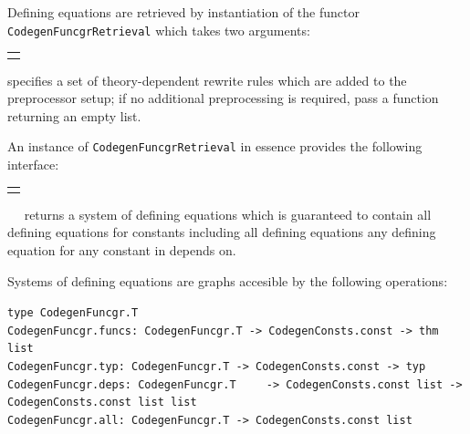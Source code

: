 \begin{isabellebody}
\begin{isamarkuptext}
  Defining equations are retrieved by instantiation
  of the functor \verb|CodegenFuncgrRetrieval|
  which takes two arguments:

  \medskip
  \begin{tabular}{l}
  \isa{val\ rewrites{\isacharcolon}\ theory\ {\isasymrightarrow}\ thm\ list}
  \end{tabular}

  \begin{description}

  \item {} specifies a set of theory-dependent
    rewrite rules which are added to the preprocessor setup;
    if no additional preprocessing is required, pass
    a function returning an empty list.

  \end{description}

  An instance of \verb|CodegenFuncgrRetrieval| in essence
  provides the following interface:

  \medskip
  \begin{tabular}{l}
  \isa{make{\isacharcolon}\ theory\ {\isasymrightarrow}\ CodegenConsts{\isachardot}const\ list\ {\isasymrightarrow}\ CodegenFuncgr{\isachardot}T} \\
  \end{tabular}

  \begin{description}

  \item {}~~ returns
    a system of defining equations which is guaranteed
    to contain all defining equations for constants 
    including all defining equations any defining equation
    for any constant in  depends on.

  \end{description}

  Systems of defining equations are graphs accesible by the
  following operations:%
\end{isamarkuptext}%
\isamarkuptrue%
%
\isadelimmlref
%
\endisadelimmlref
%
\isatagmlref
%
\begin{isamarkuptext}%
\begin{mldecls}
  \verb|type CodegenFuncgr.T| \\
  \verb|CodegenFuncgr.funcs: CodegenFuncgr.T -> CodegenConsts.const -> thm list| \\
  \verb|CodegenFuncgr.typ: CodegenFuncgr.T -> CodegenConsts.const -> typ| \\
  \verb|CodegenFuncgr.deps: CodegenFuncgr.T|\isasep\isanewline%
\verb|    -> CodegenConsts.const list -> CodegenConsts.const list list| \\
  \verb|CodegenFuncgr.all: CodegenFuncgr.T -> CodegenConsts.const list|
  \end{mldecls}


\end{isamarkuptext}
\end{isabellebody}
